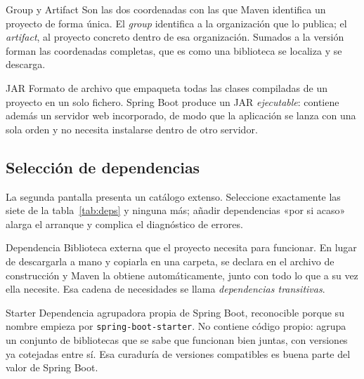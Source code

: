 \documentclass[11pt,a4paper,openany]{book}
\begin{document}
\begin{cajadefinicion}{Group y Artifact}
	Son las dos coordenadas con las que Maven identifica un proyecto de forma única. El \emph{group} identifica a la organización que lo publica; el \emph{artifact}, al proyecto concreto dentro de esa organización. Sumados a la versión forman las coordenadas completas, que es como una biblioteca se localiza y se descarga.
\end{cajadefinicion}

\begin{cajadefinicion}{JAR}
	Formato de archivo que empaqueta todas las clases compiladas de un proyecto en un solo fichero. Spring Boot produce un JAR \emph{ejecutable}: contiene además un servidor web incorporado, de modo que la aplicación se lanza con una sola orden y no necesita instalarse dentro de otro servidor.
\end{cajadefinicion}

\subsection{Selección de dependencias}
\label{sec:dependencias}

La segunda pantalla presenta un catálogo extenso. Seleccione exactamente las siete de la tabla~\ref{tab:deps} y ninguna más; añadir dependencias «por si acaso» alarga el arranque y complica el diagnóstico de errores.

\begin{cajadefinicion}{Dependencia}
	Biblioteca externa que el proyecto necesita para funcionar. En lugar de descargarla a mano y copiarla en una carpeta, se declara en el archivo de construcción y Maven la obtiene automáticamente, junto con todo lo que a su vez ella necesite. Esa cadena de necesidades se llama \emph{dependencias transitivas}.
\end{cajadefinicion}

\begin{cajadefinicion}{Starter}
	Dependencia agrupadora propia de Spring Boot, reconocible porque su nombre empieza por \texttt{spring-boot-starter}. No contiene código propio: agrupa un conjunto de bibliotecas que se sabe que funcionan bien juntas, con versiones ya cotejadas entre sí. Esa curaduría de versiones compatibles es buena parte del valor de Spring Boot.
\end{cajadefinicion}
\end{document}
